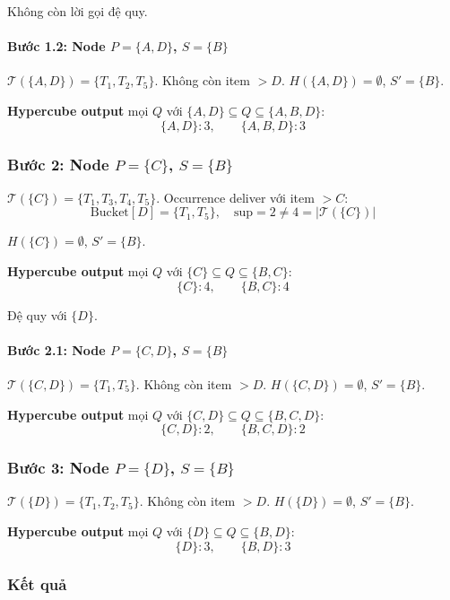 \documentclass[12pt,a4paper]{article}
\theoremstyle{definition}
\begin{document}
Không còn lời gọi đệ quy.

\paragraph{Bước 1.2: Node $P=\{A,D\}$, $S=\{B\}$}

$\mathcal{T}(\{A,D\}) = \{T_1,T_2,T_5\}$. Không còn item $> D$.
$H(\{A,D\}) = \emptyset$, $S' = \{B\}$.

\textbf{Hypercube output}  mọi $Q$ với
$\{A,D\} \subseteq Q \subseteq \{A,B,D\}$:
\[
    \{A,D\}:3,\qquad \{A,B,D\}:3
\]

\subsubsection{Bước 2: Node $P=\{C\}$, $S=\{B\}$}

$\mathcal{T}(\{C\}) = \{T_1,T_3,T_4,T_5\}$.
Occurrence deliver với item $> C$:
\[
    \text{Bucket}[D] = \{T_1,T_5\},\quad \mathrm{sup}=2
    \neq 4 = |\mathcal{T}(\{C\})|
\]

$H(\{C\}) = \emptyset$, $S' = \{B\}$.

\textbf{Hypercube output}  mọi $Q$ với
$\{C\} \subseteq Q \subseteq \{B,C\}$:
\[
    \{C\}:4,\qquad \{B,C\}:4
\]

Đệ quy với $\{D\}$.

\paragraph{Bước 2.1: Node $P=\{C,D\}$, $S=\{B\}$}

$\mathcal{T}(\{C,D\}) = \{T_1,T_5\}$. Không còn item $> D$.
$H(\{C,D\}) = \emptyset$, $S' = \{B\}$.

\textbf{Hypercube output}  mọi $Q$ với
$\{C,D\} \subseteq Q \subseteq \{B,C,D\}$:
\[
    \{C,D\}:2,\qquad \{B,C,D\}:2
\]

\subsubsection{Bước 3: Node $P=\{D\}$, $S=\{B\}$}

$\mathcal{T}(\{D\}) = \{T_1,T_2,T_5\}$. Không còn item $> D$.
$H(\{D\}) = \emptyset$, $S' = \{B\}$.

\textbf{Hypercube output}  mọi $Q$ với
$\{D\} \subseteq Q \subseteq \{B,D\}$:
\[
    \{D\}:3,\qquad \{B,D\}:3
\]

\subsubsection{Kết quả}
\end{document}
